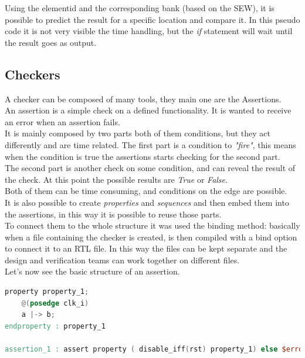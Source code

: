 \linespread{1.2}
\bigskip

Using the element\+id and the corresponding bank (based on the SEW), it is possible to predict the result for a specific location and compare it. In this pseudo code it is not very visible the time handling, but the \emph{if} statement will wait until the result goes as output.


\subsection{Checkers}
A checker can be composed of many tools, they main one are the Assertions.\\

An assertion is a simple check on a defined functionality. It is wanted to receive an error when an assertion fails.\\
It is mainly composed by two parts both of them conditions, but they act differently and are time related. The first part is a condition to \textit{"fire"}, this means when the condition is true the assertions starts checking for the second part.\cite{verification-book-2016}\\

The second part is another check on some condition, and can reveal the result of the check. At this point the possible results are \textit{True} or \textit{False}.\\

Both of them can be time consuming, and conditions on the edge are possible.\\
It is also possible to create \textit{properties} and \textit{sequences} and then embed them into the assertions, in this way it is possible to reuse those parts.\\

To connect them to the whole structure it was used the binding method: basically when a file containing the checker is created, is then compiled with a bind option to connect it to an RTL file. In this way the files can be kept separate and the design and verification teams can work together on different files. \cite{binding}\\

Let's now see the basic structure of an assertion.
\bigskip

\linespread{1}
\begin{lstlisting}[language=Verilog,style=verilog-style, backgroundcolor=\color{lyel_palette}, frame=tlb]
property property_1;
    @(posedge clk_i)
	a |-> b;
endproperty : property_1

assertion_1 : assert property ( disable_iff(rst) property_1) else $error("")

\end{lstlisting}
\linespread{1.2}
\bigskip

